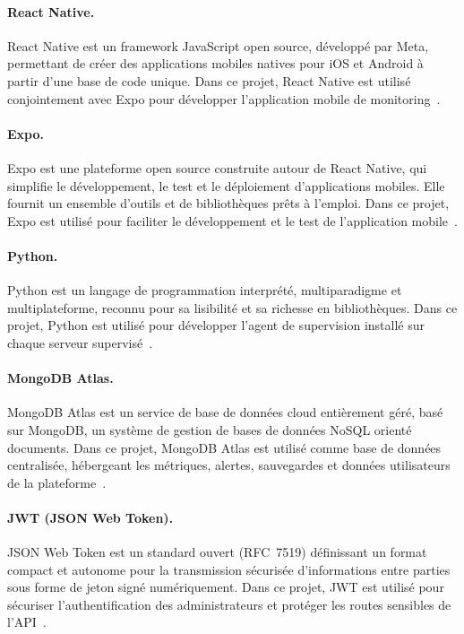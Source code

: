 
\paragraph{React Native.} React Native est un framework JavaScript open source, développé par Meta, permettant de créer des applications mobiles natives pour iOS et Android à partir d'une base de code unique. Dans ce projet, React Native est utilisé conjointement avec Expo pour développer l'application mobile de monitoring~\cite{reactnative}.


\paragraph{Expo.} Expo est une plateforme open source construite autour de React Native, qui simplifie le développement, le test et le déploiement d'applications mobiles. Elle fournit un ensemble d'outils et de bibliothèques prêts à l'emploi. Dans ce projet, Expo est utilisé pour faciliter le développement et le test de l'application mobile~\cite{expo}.


\paragraph{Python.} Python est un langage de programmation interprété, multiparadigme et multiplateforme, reconnu pour sa lisibilité et sa richesse en bibliothèques. Dans ce projet, Python est utilisé pour développer l'agent de supervision installé sur chaque serveur supervisé~\cite{python}.


\paragraph{MongoDB Atlas.} MongoDB Atlas est un service de base de données cloud entièrement géré, basé sur MongoDB, un système de gestion de bases de données NoSQL orienté documents. Dans ce projet, MongoDB Atlas est utilisé comme base de données centralisée, hébergeant les métriques, alertes, sauvegardes et données utilisateurs de la plateforme~\cite{mongodb}.


\paragraph{JWT (JSON Web Token).} JSON Web Token est un standard ouvert (RFC~7519) définissant un format compact et autonome pour la transmission sécurisée d'informations entre parties sous forme de jeton signé numériquement. Dans ce projet, JWT est utilisé pour sécuriser l'authentification des administrateurs et protéger les routes sensibles de l'API~\cite{jwt}.

